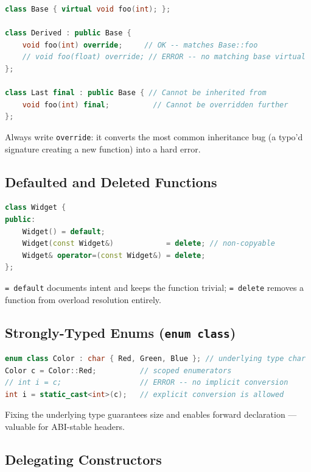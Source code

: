 \begin{lstlisting}[language=C++, caption={override and final}]
class Base { virtual void foo(int); };

class Derived : public Base {
    void foo(int) override;     // OK -- matches Base::foo
    // void foo(float) override; // ERROR -- no matching base virtual
};

class Last final : public Base { // Cannot be inherited from
    void foo(int) final;          // Cannot be overridden further
};
\end{lstlisting}

Always write \texttt{override}: it converts the most common inheritance bug (a typo'd signature creating a new function) into a hard error.

\subsection{Defaulted and Deleted Functions}

\begin{lstlisting}[language=C++, caption={=default and =delete}]
class Widget {
public:
    Widget() = default;
    Widget(const Widget&)            = delete; // non-copyable
    Widget& operator=(const Widget&) = delete;
};
\end{lstlisting}

\texttt{= default} documents intent and keeps the function trivial; \texttt{= delete} removes a function from overload resolution entirely.

\subsection{Strongly-Typed Enums (\texttt{enum class})}

\begin{lstlisting}[language=C++, caption={enum class}]
enum class Color : char { Red, Green, Blue }; // underlying type char
Color c = Color::Red;          // scoped enumerators
// int i = c;                  // ERROR -- no implicit conversion
int i = static_cast<int>(c);   // explicit conversion is allowed
\end{lstlisting}

Fixing the underlying type guarantees size and enables forward declaration --- valuable for ABI-stable headers.

\subsection{Delegating Constructors}

